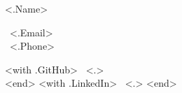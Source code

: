 \begin{minipage}[t][0.8cm][c]{.45\textwidth}
{\centering \fontsize{36pt}{42pt}\selectfont <.Name>}
\end{minipage}
\begin{minipage}[t][0.8cm][c]{0.32\textwidth}
{\fontsize{14}{18}\selectfont
\faEnvelope \ <.Email>
\vspace{6 pt}\\
\faPhone \ <.Phone>}
\end{minipage}
\begin{minipage}[t][0.8cm][c]{0.30\textwidth}
{
    \fontsize{14}{18}\selectfont
    <with .GitHub> \faGithub \ <.> \vspace{6 pt}\\ <end>
    <with .LinkedIn> \faLinkedin \ <.> <end>
}
\end{minipage}
\vspace{6 pt}\\
\noindent\makebox[\linewidth]{\rule{\paperwidth}{0.4pt}}